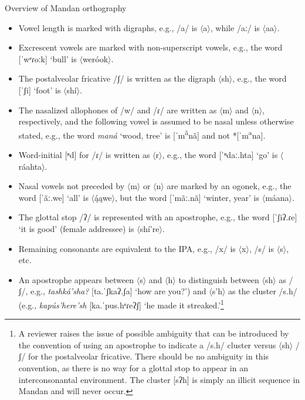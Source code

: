 \begin{exe}

\item\label{ExMandanOrthography} Overview of Mandan orthography

\begin{itemize}

\item Vowel length is marked with digraphs, e.g., /a/ is $\langle$a$\rangle$, while /aː/ is $\langle$aa$\rangle$.

\item Excrescent vowels are marked with non-superscript vowels, e.g., the word [ˈwᵉɾoːk] `bull' is $\langle$weróok$\rangle$.

\item The postalveolar fricative /ʃ/ is written as the digraph $\langle$sh$\rangle$, e.g., the word [ˈʃi] `foot' is $\langle$shí$\rangle$.

\item The nasalized allophones of /w/ and /ɾ/ are written as $\langle$m$\rangle$ and $\langle$n$\rangle$, respectively, and the following vowel is assumed to be nasal unless otherwise stated, e.g., the word \textit{maná} `wood, tree' is [ˈm\textsuperscript{ã}nã] and not *[ˈm\textsuperscript{a}na].

\item Word-initial [ⁿd] for /ɾ/ is written as $\langle$r$\rangle$, e.g., the word [ˈⁿdaː.hta] `go'  is $\langle$ráahta$\rangle$.

\item Nasal vowels not preceded by $\langle$m$\rangle$ or $\langle$n$\rangle$ are marked by an ogonek, e.g., the word [ˈãː.we] `all' is  $\langle$ą́ąwe$\rangle$, but the word [ˈmãː.nã] `winter, year' is $\langle$máana$\rangle$.


\item The glottal stop /ʔ/ is represented with an apostrophe, e.g., the word [ˈʃiʔ.ɾe] `it is good' (female addressee) is $\langle$shí're$\rangle$.

\item Remaining consonants are equivalent to the IPA, e.g., /x/ is $\langle$x$\rangle$, /s/ is $\langle$s$\rangle$, etc.

\item An apostrophe appears between $\langle$s$\rangle$ and $\langle$h$\rangle$ to distinguish between $\langle$sh$\rangle$ as /ʃ/, e.g., \textit{tashká'sha?} [ta.ˈʃkaʔ.ʃa] `how are you?') and $\langle$s'h$\rangle$ as the cluster /s.h/ (e.g., \textit{kapús'here'sh} [ka.ˈpus.hᵉɾeʔʃ] `he made it streaked.'\footnote{A reviewer raises the issue of possible ambiguity that can be introduced by the convention of using an apostrophe to indicate a /s.h/ cluster versus $\langle$sh$\rangle$ /ʃ/ for the postalveolar fricative. There should be no ambiguity in this convention, as there is no way for a glottal stop to appear in an interconsonantal environment. The cluster [sʔh] is simply an illicit sequence in Mandan and will never occur.}


\end{itemize}
\end{exe}
